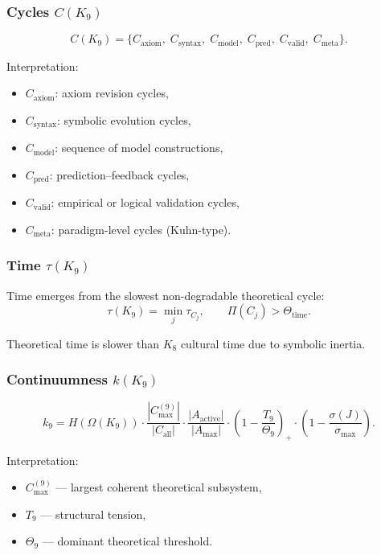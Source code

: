 \subsubsection{Cycles \texorpdfstring{$C(K_9)$}{C(K_9)}}

\[
C(K_9)=
\{
C_{\mathrm{axiom}},\;
C_{\mathrm{syntax}},\;
C_{\mathrm{model}},\;
C_{\mathrm{pred}},\;
C_{\mathrm{valid}},\;
C_{\mathrm{meta}}
\}.
\]

Interpretation:
\begin{itemize}
    \item $C_{\mathrm{axiom}}$: axiom revision cycles,
    \item $C_{\mathrm{syntax}}$: symbolic evolution cycles,
    \item $C_{\mathrm{model}}$: sequence of model constructions,
    \item $C_{\mathrm{pred}}$: prediction–feedback cycles,
    \item $C_{\mathrm{valid}}$: empirical or logical validation cycles,
    \item $C_{\mathrm{meta}}$: paradigm-level cycles (Kuhn-type).
\end{itemize}

\subsubsection{Time \texorpdfstring{$\tau(K_9)$}{\tau(K_9)}}

Time emerges from the slowest non-degradable theoretical cycle:
\[
\tau(K_9)=\min_j \tau_{C_j},
\qquad
\Pi(C_j) > \Theta_{\mathrm{time}}.
\]

Theoretical time is slower than $K_8$ cultural time due to symbolic inertia.

\subsubsection{Continuumness \texorpdfstring{$k(K_9)$}{k(K_9)}}

\[
k_9 =
H(\Omega(K_9))
\cdot
\frac{|C_{\max}^{(9)}|}{|C_{\mathrm{all}}|}
\cdot
\frac{|A_{\mathrm{active}}|}{|A_{\max}|}
\cdot
\left(1-\frac{T_9}{\Theta_9}\right)_+
\cdot
\left(1-\frac{\sigma(J)}{\sigma_{\max}}\right).
\]

Interpretation:
\begin{itemize}
    \item $C_{\max}^{(9)}$ — largest coherent theoretical subsystem,
    \item $T_9$ — structural tension,
    \item $\Theta_9$ — dominant theoretical threshold.
\end{itemize}

